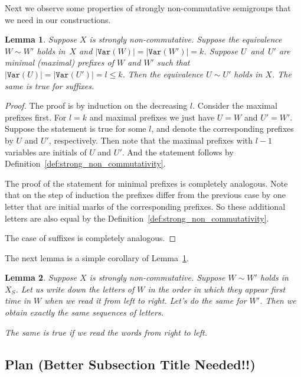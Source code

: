 \documentclass[11pt,letterpaper]{article}
\newtheorem{lemma}{Lemma}
\newcommand{\var}{\texttt{Var}}
\begin{document}
Next we observe some properties of strongly non-commutative semigroups that we
need in our constructions.

\begin{lemma} \label{lem:prefix_equivalence}
Suppose $X$ is strongly non-commutative. Suppose the equivalence $W \sim W'$
holds in~$X$ and $|\var(W)|=|\var(W')|=k$. Suppose $U$~and~$U'$ are minimal
(maximal) prefixes of $W$ and $W'$ such that $|\var(U)| = |\var(U')| = l\leq k$.
Then the equivalence $U \sim U'$ holds in $X$. The same is true for suffixes.
\end{lemma}

\begin{proof}
The proof is by induction on the decreasing $l$. Consider the maximal prefixes
first. For $l=k$ and maximal prefixes we just have $U=W$ and $U'=W'$. Suppose
the statement is true for some $l$, and denote the corresponding prefixes by $U$
and $U'$, respectively. Then note that the maximal prefixes with $l-1$ variables
are initials of $U$ and $U'$. And the statement follows by
Definition~\ref{def:strong_non_commutativity}.

The proof of the statement for minimal prefixes is completely analogous. Note
that on the step of induction the prefixes differ from the previous case by one
letter that are initial marks of the corresponding prefixes. So these additional
letters are also equal by the Definition~\ref{def:strong_non_commutativity}.

The case of suffixes is completely analogous.
\end{proof}

The next lemma is a simple corollary of Lemma~\ref{lem:prefix_equivalence}.
\begin{lemma} \label{lem:variables_order}
Suppose $X$ is strongly non-commutative. Suppose $W \sim W'$ holds in $X_S$. Let us write down the letters of $W$ in the order in which they appear first time in $W$ when we read it from left to right. Let's do the same for $W'$. Then we obtain exactly the same sequences of letters.

The same is true if we read the words from right to left.
\end{lemma}

\subsection{Plan (Better Subsection Title Needed!!)}

\end{document}
